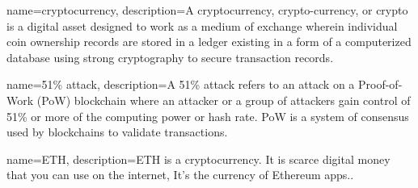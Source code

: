 \makeglossaries
 
{
    name=cryptocurrency,
    description={A cryptocurrency, crypto-currency, or crypto is a digital asset designed to work as a medium of exchange wherein individual coin ownership records are stored in a ledger existing in a form of a computerized database using strong cryptography to secure transaction records.}
}

{
    name=51\% attack,
    description={A 51\% attack refers to an attack on a Proof-of-Work (PoW) blockchain where an attacker or a group of attackers gain control of 51\% or more of the computing power or hash rate. PoW is a system of consensus used by blockchains to validate transactions.}
}

{
    name=ETH,
    description={ETH is a cryptocurrency. It is scarce digital money that you can use on the internet, It's the currency of Ethereum apps..}
}